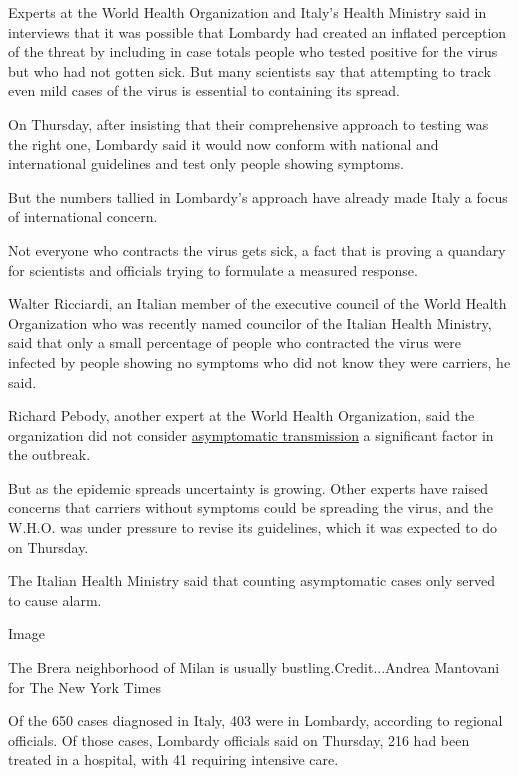 Experts at the World Health Organization and Italy's Health Ministry
said in interviews that it was possible that Lombardy had created an
inflated perception of the threat by including in case totals people who
tested positive for the virus but who had not gotten sick. But many
scientists say that attempting to track even mild cases of the virus is
essential to containing its spread.

On Thursday, after insisting that their comprehensive approach to
testing was the right one, Lombardy said it would now conform with
national and international guidelines and test only people showing
symptoms.

But the numbers tallied in Lombardy's approach have already made Italy a
focus of international concern.

Not everyone who contracts the virus gets sick, a fact that is proving a
quandary for scientists and officials trying to formulate a measured
response.

Walter Ricciardi, an Italian member of the executive council of the
World Health Organization who was recently named councilor of the
Italian Health Ministry, said that only a small percentage of people who
contracted the virus were infected by people showing no symptoms who did
not know they were carriers, he said.

Richard Pebody, another expert at the World Health Organization, said
the organization did not consider
\href{https://www.nytimes3xbfgragh.onion/2020/02/26/health/coronavirus-asymptomatic.html?algo=top_conversion\&fellback=false\&imp_id=190061349\&imp_id=162979776\&action=click\&module=Most\%20Popular\&pgtype=Homepage}{asymptomatic
transmission} a significant factor in the outbreak.

But as the epidemic spreads uncertainty is growing. Other experts have
raised concerns that carriers without symptoms could be spreading the
virus, and the W.H.O. was under pressure to revise its guidelines, which
it was expected to do on Thursday.

The Italian Health Ministry said that counting asymptomatic cases only
served to cause alarm.

Image

The Brera neighborhood of Milan is usually bustling.Credit...Andrea
Mantovani for The New York Times

Of the 650 cases diagnosed in Italy, 403 were in Lombardy, according to
regional officials. Of those cases, Lombardy officials said on Thursday,
216 had been treated in a hospital, with 41 requiring intensive care.

